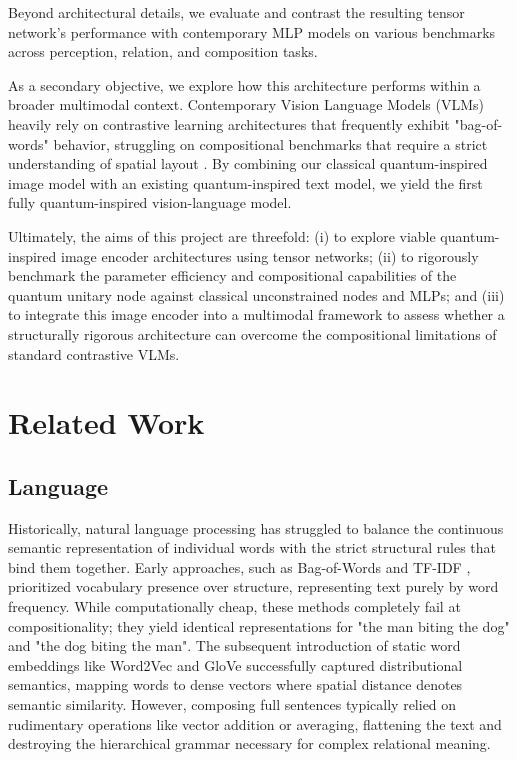 \documentclass[12pt, a4paper, oneside]{report}
\begin{document}
Beyond architectural details, we evaluate and contrast the resulting tensor network's performance with contemporary MLP models on various benchmarks across perception, relation, and composition tasks. 

As a secondary objective, we explore how this architecture performs within a broader multimodal context. Contemporary Vision Language Models (VLMs) heavily rely on contrastive learning architectures\cite{clip} that frequently exhibit "bag-of-words" behavior, struggling on compositional benchmarks that require a strict understanding of spatial layout \cite{aro}. By combining our classical quantum-inspired image model with an existing quantum-inspired text model, we yield the first fully quantum-inspired vision-language model. 

Ultimately, the aims of this project are threefold: (i) to explore viable quantum-inspired image encoder architectures using tensor networks; (ii) to rigorously benchmark the parameter efficiency and compositional capabilities of the quantum unitary node against classical unconstrained nodes and MLPs; and (iii) to integrate this image encoder into a multimodal framework to assess whether a structurally rigorous architecture can overcome the compositional limitations of standard contrastive VLMs.

\chapter{Related Work}

\section{Language}
Historically, natural language processing has struggled to balance the continuous semantic representation of individual words with the strict structural rules that bind them together. Early approaches, such as Bag-of-Words \cite{bow} and TF-IDF \cite{tfidf}, prioritized vocabulary presence over structure, representing text purely by word frequency. While computationally cheap, these methods completely fail at compositionality; they yield identical representations for "the man biting the dog" and "the dog biting the man". The subsequent introduction of static word embeddings like Word2Vec \cite{word2vec} and GloVe \cite{glove} successfully captured distributional semantics, mapping words to dense vectors where spatial distance denotes semantic similarity. However, composing full sentences typically relied on rudimentary operations like vector addition or averaging, flattening the text and destroying the hierarchical grammar necessary for complex relational meaning.
\end{document}
